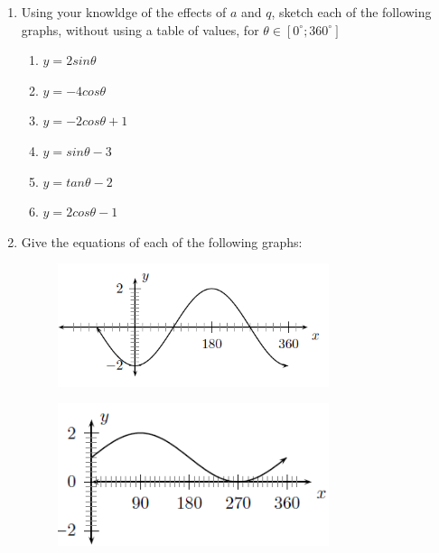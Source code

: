 \label{m39414*secfhsst!!!underscore!!!id3393}
\nopagebreak
\label{m39414*id91858}\begin{enumerate}[noitemsep, label=\textbf{\arabic*}. ] 
\label{m39414*uid90}\item Using your knowldge of the effects of $a$ and $q$, sketch each of the following graphs, without using a table of values, for $\theta \in \left[{0}^{\circ };{360}^{\circ }\right]$\label{m39414*id91924}\begin{enumerate}[noitemsep, label=\textbf{\alph*}. ] 
\label{m39414*uid91}\item $y=2sin\theta $\label{m39414*uid92}\item $y=-4cos\theta $\label{m39414*uid93}\item $y=-2cos\theta +1$\label{m39414*uid94}\item $y=sin\theta -3$\label{m39414*uid95}\item $y=tan\theta -2$\label{m39414*uid96}\item $y=2cos\theta -1$\end{enumerate}
  \label{m39414*uid97}\item Give the equations of each of the following graphs:
\setcounter{subfigure}{0}
\begin{figure}[H] %
\begin{center}
\label{m39414*id92152!!!underscore!!!media}\label{m39414*id92152!!!underscore!!!printimage}\includegraphics[width=300px]{col11306.imgs/m39414_trigrep4.png} %
\vspace{2pt}
\vspace{.1in}
\end{center}
\end{figure}       
\setcounter{subfigure}{0}
\begin{figure}[H] %
\begin{center}
\label{m39414*id92162!!!underscore!!!media}\label{m39414*id92162!!!underscore!!!printimage}\includegraphics[width=300px]{col11306.imgs/m39414_trigrep5.png} %

\end{center}
\end{figure}
\end{enumerate}
